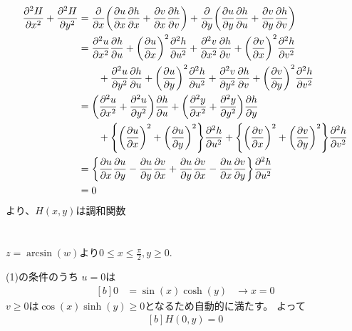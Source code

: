 \documentclass[../ap_2016.tex]{subfiles}
\begin{document}
\subsection{}
\begin{equation}\begin{aligned}[b]
    \pdv[2]{H}{x}+\pdv[2]{H}{y}
    &= \pdv{x}\qty(\pdv{u}{x}\pdv{h}{x}+\pdv{v}{x}\pdv{h}{v})+\pdv{y}\qty(\pdv{u}{y}\pdv{h}{u}+\pdv{v}{y}\pdv{h}{v})\\
    &= \pdv[2]{u}{x}\pdv{h}{u}+\qty(\pdv{u}{x})^2\pdv[2]{h}{u}+\pdv[2]{v}{x}\pdv{h}{v}+\qty(\pdv{v}{x})^2\pdv[2]{h}{v}\\
    &\qquad +\pdv[2]{u}{y}\pdv{h}{u}+\qty(\pdv{u}{y})^2\pdv[2]{h}{u}+\pdv[2]{v}{y}\pdv{h}{v}+\qty(\pdv{v}{y})^2\pdv[2]{h}{v}\\
    &=\qty(\pdv[2]{u}{x}+\pdv[2]{u}{y})\pdv{h}{u}+\qty(\pdv[2]{y}{x}+\pdv[2]{y}{y})\pdv{h}{y}\\
    &\qquad +\qty{\qty(\pdv{u}{x})^2+\qty(\pdv{u}{y})^2}\pdv[2]{h}{u} + \qty{\qty(\pdv{v}{x})^2+\qty(\pdv{v}{y})^2}\pdv[2]{h}{v}\\
    &=\qty{\pdv{u}{x}\pdv{u}{y}-\pdv{u}{y}\pdv{v}{x}+\pdv{u}{y}\pdv{v}{x}-\pdv{u}{x}\pdv{v}{y}}\pdv[2]{h}{u}\\
    &=0
\end{aligned}\end{equation}
より、\(H(x,y)\)は調和関数

\section{}
\subsection{}
\(z=\arcsin(w)\)より\(0\leq x \leq \frac{\pi}{2},y\geq 0\).

(1)の条件のうち
\(u=0\)は
\begin{equation}\begin{aligned}[b]
    0 &= \sin(x)\cosh(y) & \rightarrow x = 0
\end{aligned}\end{equation}
\(v\geq 0\)は\(\cos(x)\sinh(y)\geq 0\)となるため自動的に満たす。
よって
\begin{equation}\begin{aligned}[b]
    H(0,y)=0
\end{aligned}\end{equation}
\end{document}
